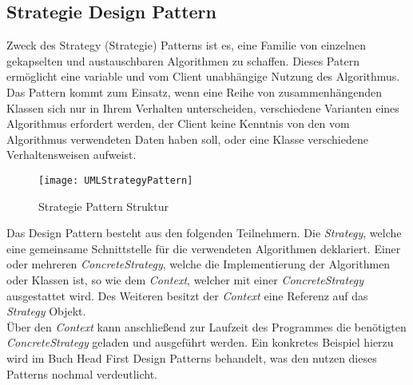 \subsection{Strategie Design Pattern}\label{sec:StrategyPattern}
Zweck des Strategy (Strategie) Patterns ist es, eine Familie von einzelnen gekapselten und austauschbaren Algorithmen zu schaffen. Dieses Patern ermöglicht eine variable und vom Client unabhängige Nutzung des Algorithmus.\\
Das Pattern kommt zum Einsatz, wenn eine Reihe von zusammenhängenden Klassen sich nur in Ihrem Verhalten unterscheiden, verschiedene Varianten eines Algorithmus erfordert werden, der Client keine Kenntnis von den vom Algorithmus verwendeten Daten haben soll, oder eine Klasse verschiedene Verhaltensweisen aufweist.\\
\begin{center}
    \begin{figure}[h]
     \centering
     \texttt{[image: UMLStrategyPattern]}
     \caption{Strategie Pattern Struktur \cite{DesignPatterns}}
    \label{fig:StrategyPattern}
    \end{figure}
\end{center}
\vspace{-2cm}
Das Design Pattern besteht aus den folgenden Teilnehmern. Die \textit{Strategy}, welche eine gemeinsame Schnittstelle für die verwendeten Algorithmen deklariert. Einer oder mehreren \textit{ConcreteStrategy}, welche die Implementierung der Algorithmen oder Klassen ist, so wie dem \textit{Context}, welcher mit einer \textit{ConcreteStrategy} ausgestattet wird. Des Weiteren besitzt der \textit{Context} eine Referenz auf das \textit{Strategy} Objekt.\cite[S.383 ff]{DesignPatterns}\\
Über den \textit{Context} kann anschließend zur Laufzeit des Programmes die benötigten \textit{ConcreteStrategy} geladen und ausgeführt werden. 
Ein konkretes Beispiel hierzu wird im Buch Head First Design Patterns \cite{HeadfirstDesignPatterns} behandelt, was den nutzen dieses Patterns nochmal verdeutlicht.